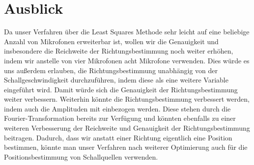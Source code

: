 
\section{Ausblick}
Da unser Verfahren über die Least Squares Methode sehr leicht auf eine beliebige Anzahl von Mikrofonen erweiterbar ist, wollen wir die Genauigkeit und insbesondere die Reichweite der Richtungsbestimmung noch weiter erhöhen, indem wir anstelle von vier Mikrofonen acht Mikrofone verwenden. Dies würde es uns außerdem erlauben, die Richtungsbestimmung unabhängig von der Schallgeschwindigkeit  durchzuführen, indem diese als eine weitere Variable eingeführt wird. Damit würde sich die Genauigkeit der Richtungsbestimmung weiter verbessern.
Weiterhin könnte die Richtungsbestimmung verbessert werden, indem auch die Amplituden mit einbezogen werden. Diese stehen durch die Fourier-Transformation bereits zur Verfügung und könnten ebenfalls zu einer weiteren Verbesserung der Reichweite und Genauigkeit der Richtungsbestimmung beitragen.
Dadurch, dass wir anstatt einer Richtung eigentlich eine Position bestimmen, könnte man unser Verfahren nach weiterer Optimierung auch für die Positionsbestimmung von Schallquellen verwenden.
